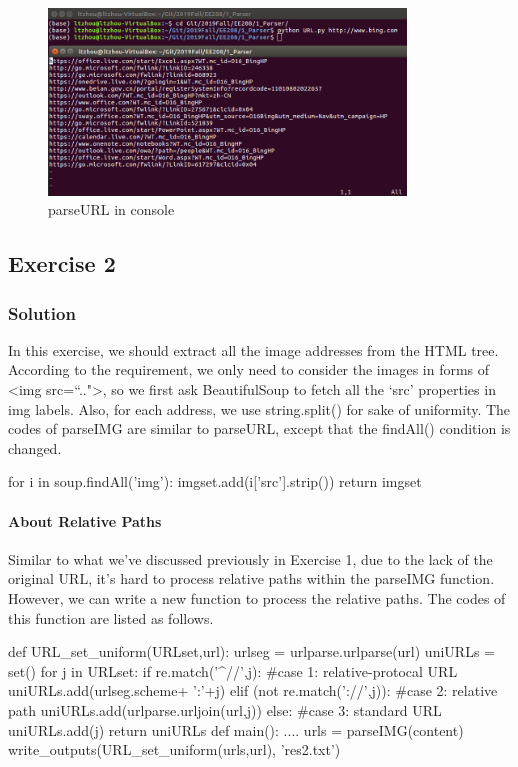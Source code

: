 \documentclass{article}
\begin{document}
\begin{figure}[htbp]
\centering
\includegraphics[width=9.5cm]{img/test1_2.png}
\caption{parseURL in console}
\label{img:1.2}
\end{figure}

\subsection{Exercise 2}

\subsubsection{Solution}

In this exercise, we should extract all the image addresses from the HTML tree. According to the requirement, we only need to consider the images in forms of <img src=``..">, so we first ask BeautifulSoup to fetch all the `src' properties in img labels. Also, for each address, we use string.split() for sake of uniformity. The codes of parseIMG are similar to parseURL, except that the findAll() condition is changed.

\begin{python}
    for i in soup.findAll('img'):
        imgset.add(i['src'].strip())
    return imgset
\end{python}

\paragraph{About Relative Paths} Similar to what we've discussed previously in Exercise 1, due to the lack of the original URL, it's hard to process relative paths within the parseIMG function. However, we can write a new function to process the relative paths. The codes of this function are listed as follows.

\begin{python}
def URL_set_uniform(URLset,url):
    urlseg = urlparse.urlparse(url)
    uniURLs = set()
    for j in URLset:
        if re.match('^//',j):         #case 1: relative-protocal URL
            uniURLs.add(urlseg.scheme+ ':'+j)
        elif (not re.match('://',j)): #case 2: relative path
            uniURLs.add(urlparse.urljoin(url,j))
        else:                         #case 3: standard URL
            uniURLs.add(j)
    return uniURLs
def main():
    ....
    urls = parseIMG(content)
    write_outputs(URL_set_uniform(urls,url), 'res2.txt')
\end{python}
\end{document}
